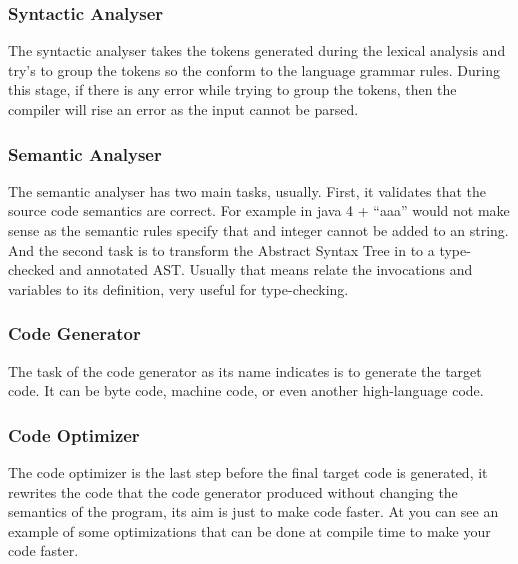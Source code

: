 \subsubsection{Syntactic Analyser}
The syntactic analyser takes the tokens generated during the lexical analysis and try’s
to group the tokens so the conform to the language grammar rules. During this stage, if there is any error while trying to
group the tokens, then the compiler will rise an error as the input cannot be parsed.

\subsubsection{Semantic Analyser}
The semantic analyser has two main tasks, usually. First, it validates that the source code semantics are correct. For
example in java 4 + “aaa” would not make sense as the semantic rules specify that and integer cannot be added to an string.
And the second task is to transform the Abstract Syntax Tree in to a type-checked
and annotated AST. Usually that means relate the invocations and variables to its definition, very useful for type-checking.

\subsubsection{Code Generator}
The task of the code generator as its name indicates is to generate the target code. It can be byte code, machine code,
or even another high-language code.

\subsubsection{Code Optimizer}
The code optimizer is the last step before the final target code is generated, it rewrites the code that the code generator
produced without changing the semantics of the program, its aim is just to make code faster. At \cite{compiler-optimizations}
you can see an example of some optimizations that can be done at compile time to make your code faster.

